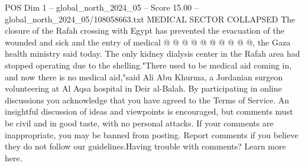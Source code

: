\begin{textsample}{POS Dim 1 – global\_north\_2024\_05 – Score 15.00 – global\_north\_2024\_05/108058663.txt}
MEDICAL SECTOR COLLAPSED The closure of the Rafah crossing with Egypt has prevented the evacuation of the wounded and sick and the entry of medical @ @ @ @ @ @ @ @ @ @, the Gaza health ministry said today.
The only kidney dialysis center in the Rafah area had stopped operating due to the shelling."There used to be medical aid coming in, and now there is no medical aid,"said Ali Abu Khurma, a Jordanian surgeon volunteering at Al Aqsa hospital in Deir al-Balah.
By participating in online discussions you acknowledge that you have agreed to the Terms of Service.
An insightful discussion of ideas and viewpoints is encouraged, but comments must be civil and in good taste, with no personal attacks.
If your comments are inappropriate, you may be banned from posting.
Report comments if you believe they do not follow our guidelines.Having trouble with comments?
Learn more here.

\end{textsample}
